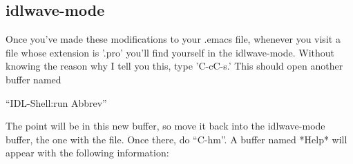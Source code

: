 \subsection{idlwave-mode}\label{sec:qs-idlwave-mode}

  Once you've made these modifications to your .emacs file, whenever you
  visit a file whose extension is '.pro' you'll find yourself in the
  idlwave-mode. Without knowing the reason why I tell you this, type
  'C-cC-s.' This should open another buffer named 

  ``IDL-Shell:run Abbrev'' 

  The point will be in this new buffer, so move it back into the
  idlwave-mode buffer, the one with the file. Once there, do
  ``C-hm''. A buffer named *Help* will appear with the following
  information:

